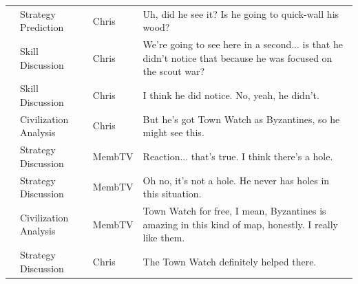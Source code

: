 {\begin{longtable}{@{}>{\theAppRow}r|L{2.3cm}L{1.0cm}U{11.55cm}@{}}
    & Strategy Prediction   & Chris        & Uh, did he see it? Is he going to quick-wall his wood?                                                                                                                                                                                                           \\
    & Skill Discussion      & Chris        & We're going to see here in a second... is that he didn't notice that because he was focused on the scout war?                                                                                                                                                    \\
    & Skill Discussion      & Chris        & I think he did notice. No, yeah, he didn't.                                                                                                                                                                                                                      \\
    & Civilization Analysis & Chris        & But he's got Town Watch as Byzantines, so he might see this.                                                                                                                                                                                                     \\
    & Strategy Discussion   & MembTV       & Reaction... that's true. I think there's a hole.                                                                                                                                                                                                                 \\
    & Strategy Discussion   & MembTV       & Oh no, it's not a hole. He never has holes in this situation.                                                                                                                                                                                                    \\
    & Civilization Analysis & MembTV       & Town Watch for free, I mean, Byzantines is amazing in this kind of map, honestly. I really like them.                                                                                                                                                            \\
    & Strategy Discussion   & Chris        & The Town Watch definitely helped there.                                                                                                                                                                                                                          \\

\end{longtable}}
